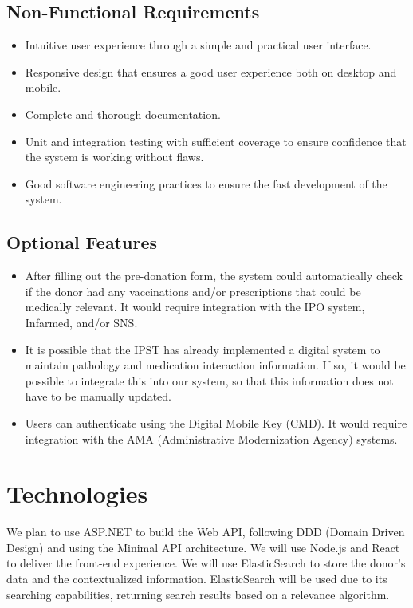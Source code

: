 \documentclass[a4paper,11pt]{article}
\begin{document}
\subsection{Non-Functional Requirements}
\begin{itemize}
	\item Intuitive user experience through a simple and practical user interface.
	
	\item Responsive design that ensures a good user experience both on desktop and mobile.
	
	\item Complete and thorough documentation.
	
	\item Unit and integration testing with sufficient coverage to ensure confidence that the system is working without flaws.
	
	\item Good software engineering practices to ensure the fast development of the system.
\end{itemize}

\subsection{Optional Features}
\begin{itemize}
	\item After filling out the pre-donation form, the system could automatically check if the donor had any vaccinations and/or prescriptions that could be medically relevant. It would require integration with the IPO system, Infarmed, and/or SNS.
	\item It is possible that the IPST has already implemented a digital system to maintain pathology and medication interaction information. If so, it would be possible to integrate this into our system, so that this information does not have to be manually updated.
	\item Users can authenticate using the Digital Mobile Key (CMD). It would require integration with the AMA (Administrative Modernization Agency) systems.
\end{itemize}

\section{Technologies}
We plan to use ASP.NET \cite{aspnet} to build the Web API, following DDD (Domain Driven Design) and using the Minimal API \cite{minimalAPI} architecture. We will use Node.js \cite{nodejs} and React \cite{react} to deliver the front-end experience. We will use ElasticSearch \cite{elasticsearch} to store the donor’s data and the contextualized information. ElasticSearch will be used due to its searching capabilities, returning search results based on a relevance algorithm.
\end{document}
